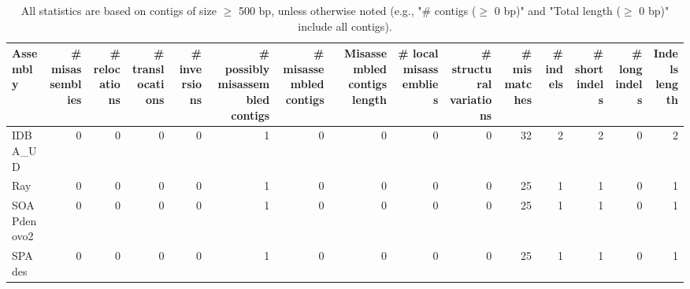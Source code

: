 \documentclass[12pt,a4paper]{article}
\begin{document}
\begin{table}[ht]
\begin{center}
\caption{All statistics are based on contigs of size $\geq$ 500 bp, unless otherwise noted (e.g., "\# contigs ($\geq$ 0 bp)" and "Total length ($\geq$ 0 bp)" include all contigs).}
\begin{tabular}{|l*{14}{|r}|}
\hline
Assembly & \# misassemblies &     \# relocations &     \# translocations &     \# inversions & \# possibly misassembled contigs & \# misassembled contigs & Misassembled contigs length & \# local misassemblies & \# structural variations & \# mismatches & \# indels &     \# short indels &     \# long indels & Indels length \\ \hline
IDBA\_UD & 0 & 0 & 0 & 0 & 1 & 0 & 0 & 0 & 0 & 32 & 2 & 2 & 0 & 2 \\ \hline
Ray & 0 & 0 & 0 & 0 & 1 & 0 & 0 & 0 & 0 & 25 & 1 & 1 & 0 & 1 \\ \hline
SOAPdenovo2 & 0 & 0 & 0 & 0 & 1 & 0 & 0 & 0 & 0 & 25 & 1 & 1 & 0 & 1 \\ \hline
SPAdes & 0 & 0 & 0 & 0 & 1 & 0 & 0 & 0 & 0 & 25 & 1 & 1 & 0 & 1 \\ \hline
\end{tabular}
\end{center}
\end{table}
\end{document}

